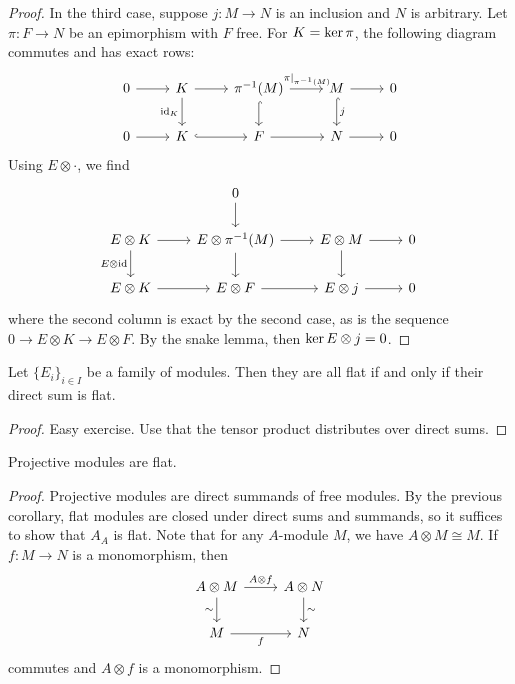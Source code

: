 \begin{proof}
  In the third case, suppose $j: M \to N$ is an inclusion and $N$ is arbitrary.
  Let $\pi: F \to N$ be an epimorphism with $F$ free.
  For $K = \operatorname{ker} \pi$, the following diagram commutes and has exact rows:
  \[\begin{tikzcd}
	  0 & K & {\pi^{-1}(M)} & M & 0 \\
	  0 & K & F & N & 0
	  \arrow[from=1-1, to=1-2]
	  \arrow[from=1-2, to=1-3]
	  \arrow["{\id_K}"', from=1-2, to=2-2]
	  \arrow["{\left. \pi \right|_{\pi^{-1}(M)}}", from=1-3, to=1-4]
	  \arrow[hook, from=1-3, to=2-3]
	  \arrow[from=1-4, to=1-5]
	  \arrow["j", hook, from=1-4, to=2-4]
	  \arrow[from=2-1, to=2-2]
	  \arrow[hook, from=2-2, to=2-3]
	  \arrow[from=2-3, to=2-4]
	  \arrow[from=2-4, to=2-5]
	\end{tikzcd}\]
  Using $E \otimes \cdot$, we find
  \[\begin{tikzcd}
	  & 0 \\
	  {E \otimes K} & {E \otimes \pi^{-1}(M)} & {E \otimes M} & 0 \\
	  {E \otimes K} & {E \otimes F} & {E \otimes j} & 0
	  \arrow[from=1-2, to=2-2]
	  \arrow[from=2-1, to=2-2]
	  \arrow["{E \otimes \id}"', from=2-1, to=3-1]
	  \arrow[from=2-2, to=2-3]
	  \arrow[from=2-2, to=3-2]
	  \arrow[from=2-3, to=2-4]
	  \arrow[from=2-3, to=3-3]
	  \arrow[from=3-1, to=3-2]
	  \arrow[from=3-2, to=3-3]
	  \arrow[from=3-3, to=3-4]
	\end{tikzcd}\]
  where the second column is exact by the second case, as is the sequence $0 \to
  E \otimes K \to E \otimes F$.
  By the snake lemma, then $\operatorname{ker} E \otimes j = 0$.
\end{proof}

\begin{corollary}
  Let $\{E_i\}_{i \in I}$ be a family of modules.
  Then they are all flat if and only if their direct sum is flat.
\end{corollary}

\begin{proof}
  Easy exercise.
  Use that the tensor product distributes over direct sums.
\end{proof}

\begin{corollary}
  Projective modules are flat.
\end{corollary}

\begin{proof}
  Projective modules are direct summands of free modules.
  By the previous corollary, flat modules are closed under direct sums and
  summands, so it suffices to show that $A_A$ is flat.
  Note that for any $A$-module $M$, we have $A \otimes M \cong M$.
  If $f: M \to N$ is a monomorphism, then
  \[\begin{tikzcd}
	  {A \otimes M} & {A \otimes N} \\
	  M & N
	  \arrow["{A \otimes f}", from=1-1, to=1-2]
	  \arrow["\sim"', from=1-1, to=2-1]
	  \arrow["\sim", from=1-2, to=2-2]
	  \arrow["f"', from=2-1, to=2-2]
	\end{tikzcd}\]
  commutes and $A \otimes f$ is a monomorphism.
\end{proof}

